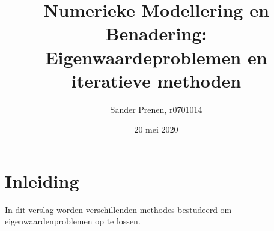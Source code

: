 \documentclass[a4paper, 12pt, titlepage, fleqn]{article}
\begin{document}
\title{\textbf{Numerieke Modellering en Benadering: Eigenwaardeproblemen en iteratieve methoden}}
\author{Sander Prenen, r0701014}

\date{20 mei 2020}
\begin{titlepage}
	\maketitle
	\thispagestyle{empty}
\end{titlepage}

\newpage
\tableofcontents
\listoffigures
\newpage

\section{Inleiding}
In dit verslag worden verschillenden methodes bestudeerd om eigenwaardenproblemen op te lossen.
\end{document}
